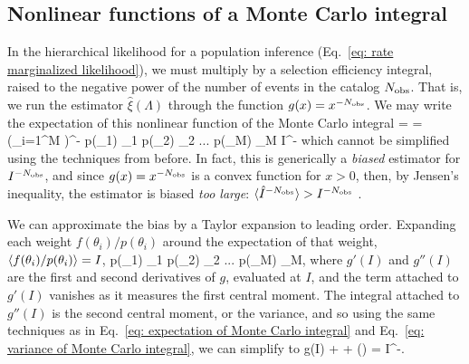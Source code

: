 \subsection{Nonlinear functions of a Monte Carlo integral}
\label{subsec: mc monte carlo bias}

In the hierarchical likelihood for a population inference (Eq.~\ref{eq: rate marginalized likelihood}), we must multiply by a selection efficiency integral, raised to the negative power of the number of events in the catalog $N_{\rm obs}$. That is, we run the estimator $\hat{\xi}(\Lambda)$ through the function $g(x) = x^{-N_{\rm obs}}$. We may write the expectation of this nonlinear function of the Monte Carlo integral
\beq
{} =  = \int \left(\sum_{i=1}^M \right)^{-\Nobs} p(\theta_1) \dd\theta_1 p(\theta_2) \dd\theta_2 ... p(\theta_M) \dd\theta_M \neq I^{-\Nobs}
\eeq
which cannot be simplified using the techniques from before. In fact, this is generically a \textit{biased} estimator for $I^{-N_{\rm obs}}$, and since $g(x) = x^{-N_{\rm obs}}$ is a convex function for $x > 0$, then, by Jensen's inequality, the estimator is biased \textit{too large}: $\langle \hat{I}^{-N_{\rm obs}}\rangle > I^{-N_{\rm obs}}$ \citep{kendall1977advanced, MacKay2003}. 

We can approximate the bias by a Taylor expansion to leading order. Expanding each weight $f(\theta_i) / p(\theta_i)$ around the expectation of that weight, $\langle f(\theta_i) / p(\theta_i)\rangle = I$, 
\beq
{} \approx \int \left[g(I) + \frac{g''(I)}{2M^2}\sum_{i=1}^M \left(\frac{f(\theta_i)}{p(\theta_i)} - I\right)^2 + \mathcal{O}\left(\frac{1}{M^2}\right)\right] p(\theta_1) \dd\theta_1 p(\theta_2) \dd\theta_2 ... p(\theta_M) \dd\theta_M,
\eeq
where $g'(I)$ and $g''(I)$ are the first and second derivatives of $g$, evaluated at $I$, and the term attached to $g'(I)$ vanishes as it measures the first central moment. The integral attached to $g''(I)$ is the second central moment, or the variance, and so
using the same techniques as in Eq.~\ref{eq: expectation of Monte Carlo integral} and Eq.~\ref{eq: variance of Monte Carlo integral}, we can simplify to
\beq
{} \approx g(I) +  + \left(\right) = I^{-\Nobs}.
\label{eq: bias for mean raised to power}
\eeq

